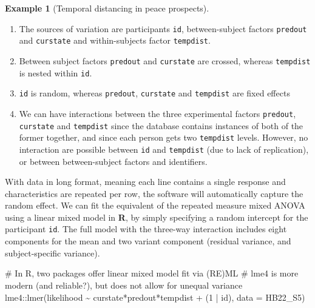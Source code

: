 \documentclass[
  11pt,
  letterpaper,
]{scrbook}
\newenvironment{Shaded}{\begin{snugshade}}{\end{snugshade}}
\newcommand{\AttributeTok}[1]{\textcolor[rgb]{0.40,0.45,0.13}{#1}}
\newcommand{\CommentTok}[1]{\textcolor[rgb]{0.37,0.37,0.37}{#1}}
\newcommand{\DecValTok}[1]{\textcolor[rgb]{0.68,0.00,0.00}{#1}}
\newcommand{\FunctionTok}[1]{\textcolor[rgb]{0.28,0.35,0.67}{#1}}
\newcommand{\NormalTok}[1]{\textcolor[rgb]{0.00,0.23,0.31}{#1}}
\newcommand{\SpecialCharTok}[1]{\textcolor[rgb]{0.37,0.37,0.37}{#1}}
\providecommand{\tightlist}{%
  \setlength{\itemsep}{0pt}\setlength{\parskip}{0pt}}\usepackage{longtable,booktabs,array}
\theoremstyle{definition}
\newtheorem{example}{Example}[chapter]
\theoremstyle{definition}
\theoremstyle{remark}
\begin{document}
\begin{example}[Temporal distancing in peace
prospects]
\begin{enumerate}
\def\labelenumi{\arabic{enumi}.}
\tightlist
\item
  The sources of variation are participants \texttt{id}, between-subject
  factors \texttt{predout} and \texttt{curstate} and within-subjects
  factor \texttt{tempdist}.
\item
  Between subject factors \texttt{predout} and \texttt{curstate} are
  crossed, whereas \texttt{tempdist} is nested within \texttt{id}.
\item
  \texttt{id} is random, whereas \texttt{predout}, \texttt{curstate} and
  \texttt{tempdist} are fixed effects
\item
  We can have interactions between the three experimental factors
  \texttt{predout}, \texttt{curstate} and \texttt{tempdist} since the
  database contains instances of both of the former together, and since
  each person gets two \texttt{tempdist} levels. However, no interaction
  are possible between \texttt{id} and \texttt{tempdist} (due to lack of
  replication), or between between-subject factors and identifiers.
\end{enumerate}

With data in long format, meaning each line contains a single response
and characteristics are repeated per row, the software will
automatically capture the random effect. We can fit the equivalent of
the repeated measure mixed ANOVA using a linear mixed model in
\textbf{R}, by simply specifying a random intercept for the participant
\texttt{id}. The full model with the three-way interaction includes
eight components for the mean and two variant component (residual
variance, and subject-specific variance).

\begin{Shaded}
\begin{Highlighting}[]
\CommentTok{\# In R, two packages offer linear mixed model fit via (RE)ML}
\CommentTok{\# lme4 is more modern (and reliable?), but does not allow for unequal variance}
\NormalTok{lme4}\SpecialCharTok{::}\FunctionTok{lmer}\NormalTok{(likelihood }\SpecialCharTok{\textasciitilde{}}\NormalTok{ curstate}\SpecialCharTok{*}\NormalTok{predout}\SpecialCharTok{*}\NormalTok{tempdist }\SpecialCharTok{+}\NormalTok{ (}\DecValTok{1} \SpecialCharTok{|}\NormalTok{ id),}
           \AttributeTok{data =}\NormalTok{ HB22\_S5)}
\end{Highlighting}
\end{Shaded}


\end{example}
\end{document}
